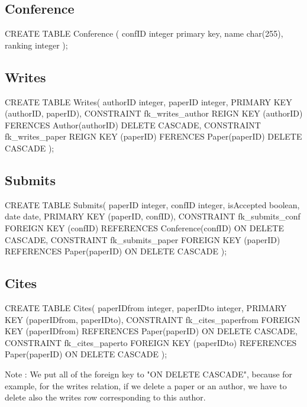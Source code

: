 \documentclass[a4paper,11pt]{report}
\begin{document}
\subsection*{Conference}
\begin{sqlcode}
  CREATE TABLE Conference (
    confID  integer primary key,
    name    char(255),
    ranking integer
  );
\end{sqlcode}

\subsection*{Writes}
\begin{sqlcode}
  CREATE TABLE Writes(
    authorID integer,
    paperID integer,
    PRIMARY KEY (authorID, paperID),
    CONSTRAINT fk_writes_author
    REIGN KEY (authorID)
    FERENCES Author(authorID)
    DELETE CASCADE,
    CONSTRAINT fk_writes_paper
    REIGN KEY (paperID)
    FERENCES Paper(paperID)
    DELETE CASCADE
  );
\end{sqlcode}

\subsection*{Submits}
\begin{sqlcode}
  CREATE TABLE Submits(
    paperID integer,
    confID integer,
    isAccepted boolean,
    date date,
    PRIMARY KEY (paperID, confID),
    CONSTRAINT fk_submits_conf
    FOREIGN KEY (confID)
    REFERENCES Conference(confID)
    ON DELETE CASCADE,
    CONSTRAINT fk_submits_paper
    FOREIGN KEY (paperID)
    REFERENCES Paper(paperID)
    ON DELETE CASCADE
  );
\end{sqlcode}

\subsection*{Cites}
\begin{sqlcode}
  CREATE TABLE Cites(
    paperIDfrom integer, 
    paperIDto integer,
    PRIMARY KEY (paperIDfrom, paperIDto),
    CONSTRAINT fk_cites_paperfrom
    FOREIGN KEY (paperIDfrom)
    REFERENCES Paper(paperID)
    ON DELETE CASCADE,
    CONSTRAINT fk_cites_paperto
    FOREIGN KEY (paperIDto)
    REFERENCES Paper(paperID)
    ON DELETE CASCADE
  );
\end{sqlcode}

Note : We put all of the foreign key to "ON DELETE CASCADE", because for
example, for the writes relation, if we delete a paper or an author, we have to
delete also the writes row corresponding to this author.
\end{document}
